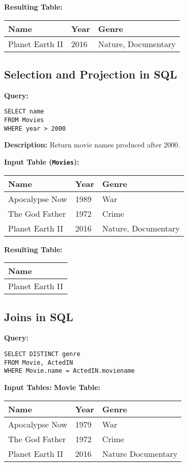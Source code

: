 \documentclass{article}
\begin{document}
\textbf{Resulting Table:}
\begin{tabular}{|l|l|l|}
    \hline
    \textbf{Name} & \textbf{Year} & \textbf{Genre} \\
    \hline
    Planet Earth II & 2016 & Nature, Documentary \\
    \hline
\end{tabular}


\subsection*{Selection and Projection in SQL}
\textbf{Query:}
\begin{lstlisting}
SELECT name
FROM Movies
WHERE year > 2000
\end{lstlisting}
\textbf{Description:} Return movie names produced after 2000.

\textbf{Input Table (\texttt{Movies}):}
\begin{tabular}{|l|l|l|}
    \hline
    \textbf{Name} & \textbf{Year} & \textbf{Genre} \\
    \hline
    Apocalypse Now & 1989 & War \\
    The God Father & 1972 & Crime \\
    Planet Earth II & 2016 & Nature, Documentary \\
    \hline
\end{tabular}


\textbf{Resulting Table:}
\begin{tabular}{|l|}
    \hline
    \textbf{Name} \\
    \hline
    Planet Earth II \\
    \hline
\end{tabular}


\subsection*{Joins in SQL}
\textbf{Query:}
\begin{lstlisting}
SELECT DISTINCT genre
FROM Movie, ActedIN
WHERE Movie.name = ActedIN.moviename
\end{lstlisting}

\textbf{Input Tables:}
\textbf{Movie Table:}
\begin{tabular}{|l|l|l|}
    \hline
    \textbf{Name} & \textbf{Year} & \textbf{Genre} \\
    \hline
    Apocalypse Now & 1979 & War \\
    The God Father & 1972 & Crime \\
    Planet Earth II & 2016 & Nature Documentary \\
    \hline
\end{tabular}
\end{document}
